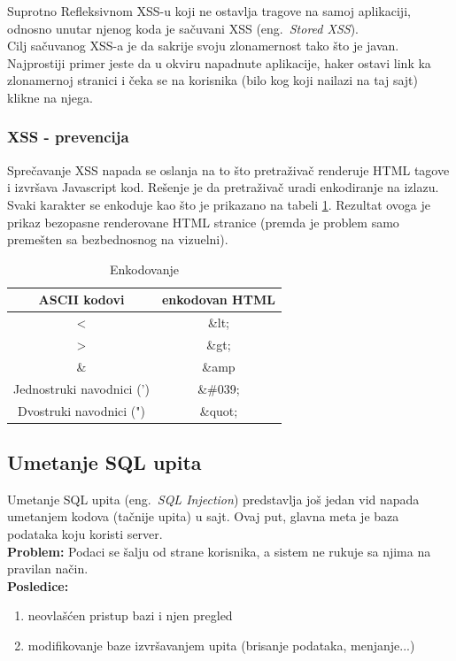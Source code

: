 \documentclass[a4paper]{article}
\begin{document}
Suprotno Refleksivnom XSS-u koji ne ostavlja tragove na samoj aplikaciji, odnosno unutar njenog koda je sačuvani XSS (eng.~{\em Stored XSS}).\\ Cilj sačuvanog XSS-a je da sakrije svoju zlonamernost tako što je javan. Najprostiji primer jeste da u okviru napadnute aplikacije, haker ostavi link ka zlonamernoj stranici i čeka se na korisnika (bilo kog koji nailazi na taj sajt) klikne na njega.

\subsubsection{XSS - prevencija}

Sprečavanje XSS \cite{XSS_prev} napada se oslanja na to što pretraživač renderuje HTML tagove i izvršava Javascript kod. Rešenje je da pretraživač uradi enkodiranje na izlazu. Svaki karakter se enkoduje kao što je prikazano na tabeli \ref{kodiranje}. Rezultat ovoga je prikaz bezopasne renderovane HTML stranice (premda je problem samo premešten sa bezbednosnog na vizuelni).

\begin{table}[ht]

\begin{center}
\caption{Enkodovanje}
\begin{tabular}{ | c | c | }
\hline
	\rowcolor{yellow}
\textbf{ASCII kodovi} & \textbf{enkodovan HTML} \\
	\hline
 < & \&lt; \\ 
 \hline
 > & \&gt; \\  
 \hline
 \& & \&amp \\
 \hline
 Jednostruki navodnici (') & \&\#039;\\
 \hline
 Dvostruki navodnici (") & \&quot;\\  
 \hline  
\end{tabular}

\label{kodiranje}
\end{center}
\end{table}

\subsection{Umetanje SQL upita}

Umetanje SQL upita (eng.~{\em SQL Injection}) \cite{SQL} predstavlja još jedan vid napada umetanjem kodova (tačnije upita) u sajt. Ovaj put, glavna meta je baza podataka koju koristi server.\\
\textbf{Problem:} Podaci se šalju od strane korisnika, a sistem ne rukuje sa njima na pravilan način.\\
\textbf{Posledice:} 
\begin{enumerate}
	\item neovlašćen pristup bazi i njen pregled
	\item modifikovanje baze izvršavanjem upita (brisanje podataka, menjanje...)
\end{enumerate}
\end{document}
